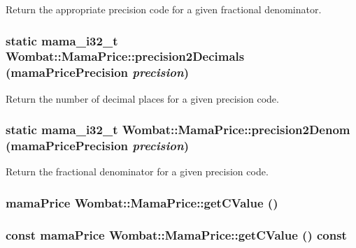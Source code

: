 Return the appropriate precision code for a given fractional denominator. \hypertarget{classWombat_1_1MamaPrice_aa0e9229468d1e14e03bdf1fc901eaf3d}{
\subsubsection[{precision2Decimals}]{\setlength{\rightskip}{0pt plus 5cm}static mama\_\-i32\_\-t Wombat::MamaPrice::precision2Decimals (mamaPricePrecision {\em precision})}}
\label{classWombat_1_1MamaPrice_aa0e9229468d1e14e03bdf1fc901eaf3d}


Return the number of decimal places for a given precision code. \hypertarget{classWombat_1_1MamaPrice_a091e452e546dd5a8add9de6a1fbca364}{
\subsubsection[{precision2Denom}]{\setlength{\rightskip}{0pt plus 5cm}static mama\_\-i32\_\-t Wombat::MamaPrice::precision2Denom (mamaPricePrecision {\em precision})}}
\label{classWombat_1_1MamaPrice_a091e452e546dd5a8add9de6a1fbca364}


Return the fractional denominator for a given precision code. \hypertarget{classWombat_1_1MamaPrice_a21d57c1c44d9495a71bd29e07d3ac9a7}{
\subsubsection[{getCValue}]{\setlength{\rightskip}{0pt plus 5cm}mamaPrice Wombat::MamaPrice::getCValue ()}}
\label{classWombat_1_1MamaPrice_a21d57c1c44d9495a71bd29e07d3ac9a7}
\hypertarget{classWombat_1_1MamaPrice_a653f2e58af782ef2b3549332cc804196}{
\subsubsection[{getCValue}]{\setlength{\rightskip}{0pt plus 5cm}const mamaPrice Wombat::MamaPrice::getCValue () const}}
\label{classWombat_1_1MamaPrice_a653f2e58af782ef2b3549332cc804196}
